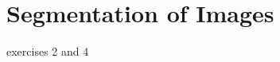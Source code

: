 \documentclass[../Head/Main.tex]{subfiles}
\begin{document}
\section{Segmentation of Images}
exercises 2 and 4
\end{document}
